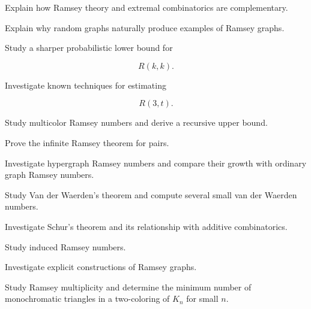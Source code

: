 \begin{exercise}[3]
Explain how Ramsey theory and extremal combinatorics are complementary.
\end{exercise}

\begin{exercise}[3]
Explain why random graphs naturally produce examples of Ramsey graphs.
\end{exercise}

\begin{exercise}[4]
Study a sharper probabilistic lower bound for

\[
R(k,k).
\]
\end{exercise}

\begin{exercise}[4]
Investigate known techniques for estimating

\[
R(3,t).
\]
\end{exercise}

\begin{exercise}[4]
Study multicolor Ramsey numbers and derive a recursive upper bound.
\end{exercise}

\begin{exercise}[4]
Prove the infinite Ramsey theorem for pairs.
\end{exercise}

\begin{exercise}[4]
Investigate hypergraph Ramsey numbers and compare their growth with
ordinary graph Ramsey numbers.
\end{exercise}

\begin{exercise}[4]
Study Van der Waerden's theorem and compute several small van der
Waerden numbers.
\end{exercise}

\begin{exercise}[4]
Investigate Schur's theorem and its relationship with additive
combinatorics.
\end{exercise}

\begin{exercise}[4]
Study induced Ramsey numbers.
\end{exercise}

\begin{exercise}[4]
Investigate explicit constructions of Ramsey graphs.
\end{exercise}

\begin{exercise}[4]
Study Ramsey multiplicity and determine the minimum number of
monochromatic triangles in a two-coloring of \(K_n\) for small \(n\).
\end{exercise}

